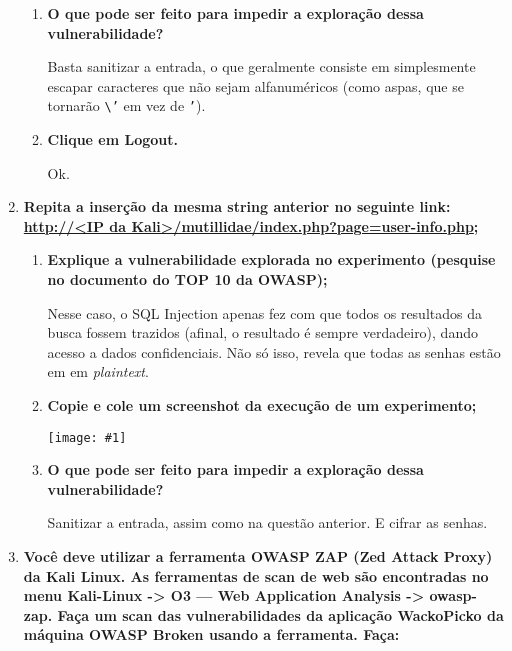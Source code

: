 \documentclass{article}
\newcommand{\code}[1]{\texttt{#1}}
\newcommand{\img}[1]{%
    \texttt{[image: \#1]}
}
\begin{document}
\begin{enumerate}
\begin{enumerate}
                \item \textbf{O que pode ser feito para impedir a exploração
                    dessa vulnerabilidade?}

                    Basta sanitizar a entrada, o que geralmente consiste em
                    simplesmente escapar caracteres que não sejam alfanuméricos
                    (como aspas, que se tornarão \code{\textbackslash'} em vez
                    de \code{'}).

                \item \textbf{Clique em Logout.}

                    Ok.

            \end{enumerate}
        \item \textbf{Repita a inserção da mesma string anterior no seguinte
                link: \url{http://<IP da
            Kali>/mutillidae/index.php?page=user-info.php};}
            \begin{enumerate}
                \item \textbf{Explique a vulnerabilidade explorada no
                    experimento (pesquise no documento do TOP 10 da OWASP);}

                    Nesse caso, o SQL Injection apenas fez com que todos os
                    resultados da busca fossem trazidos (afinal, o resultado é
                    sempre verdadeiro), dando acesso a dados confidenciais. Não
                    só isso, revela que todas as senhas estão em em
                    \textit{plaintext}.

                \item \textbf{Copie e cole um screenshot da execução de um
                    experimento;}

                    \img{imgs/q2_3}

                \item \textbf{O que pode ser feito para impedir a exploração
                    dessa vulnerabilidade?}

                    Sanitizar a entrada, assim como na questão anterior. E
                    cifrar as senhas.
            \end{enumerate}
        \item \textbf{Você deve utilizar a ferramenta OWASP ZAP (Zed Attack
                Proxy) da Kali Linux. As ferramentas de scan de web são
                encontradas no menu Kali-Linux -> O3 --- Web Application
                Analysis -> owasp-zap. Faça um scan das vulnerabilidades da
                aplicação WackoPicko da máquina OWASP Broken usando a
            ferramenta. Faça:}


\end{enumerate}
\end{document}
